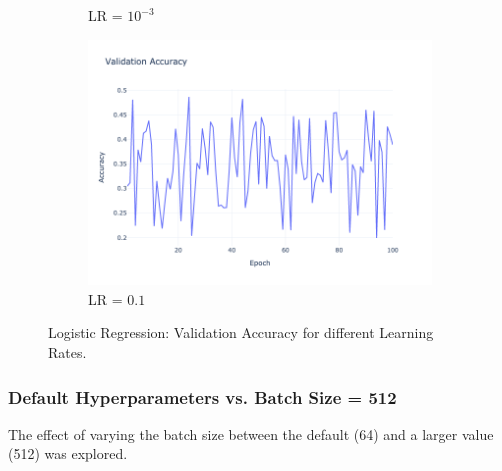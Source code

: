 \begin{figure}[htbp!]
\begin{subfigure}{0.32\textwidth}
        \caption{LR = $10^{-3}$}
    \end{subfigure}
    \begin{subfigure}{0.32\textwidth}
        \centering
        \includegraphics[width=\textwidth]{images/logistic_regression-validation-accuracy-batch-32-lr-0.1-epochs-100-l2-0.01-opt-sgd.png}
        \caption{LR = $0.1$}
    \end{subfigure}
    \caption{Logistic Regression: Validation Accuracy for different Learning Rates.}
    \label{fig:log_reg_acc}
\end{figure}


\subsubsection{Default Hyperparameters vs. Batch Size = 512}
The effect of varying the batch size between the default (64) and a larger value (512) was explored.

